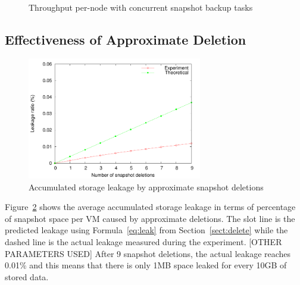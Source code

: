 \begin{figure}
    \centering
    \\
    \caption{Throughput per-node with concurrent snapshot backup tasks}
    \label{fig:parallel_backup}
\end{figure}

\subsection{Effectiveness of Approximate Deletion}
\begin{figure}
    \centering
    \includegraphics[width=3in]{figures/leakage}
    \caption{Accumulated storage leakage by approximate snapshot deletions}
    \label{fig:leakage}
\end{figure}

Figure~\ref{fig:leakage} shows the average accumulated storage leakage in terms of percentage of
snapshot space per VM caused  by approximate deletions.
The slot line is the predicted leakage using Formula~\ref{eq:leak} from Section~\ref{sect:delete}
while the dashed line is the actual leakage measured during the experiment.
[OTHER PARAMETERS USED]
After 9 snapshot deletions, the actual leakage reaches 0.01\% and this means that
there is only 1MB space leaked for every 10GB of stored data. 
